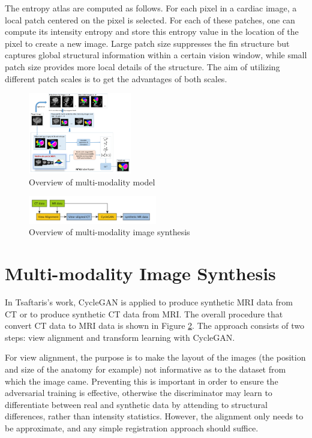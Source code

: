 \documentclass[10pt,sigconf,letterpaper,nonacm]{acmart}
\begin{document}
 The entropy atlas are computed as follows\cite{wachinger2012entropy}. For each pixel in a cardiac image, a local patch centered on the pixel is selected. For each of these patches, one can compute its intensity entropy and store this entropy value in the location of the pixel to create a new image. Large patch size suppresses the fin structure but captures global structural information within a certain vision window, while small patch size provides more local details of the structure. The aim of utilizing different patch scales is to get the advantages of both scales.
 
 
\begin{figure}
	\centering
	\includegraphics[width=0.4\textwidth]{images/yihao_overview.png}
	\caption{Overview of multi-modality model}
	\label{yihao_overview}
\end{figure} 

\begin{figure}
	\centering
	\includegraphics[width=0.5\textwidth]{images/Xiangyu_overview.png}
	\caption{Overview of multi-modality image synthesis}
	\label{Xiangyu_overview}
\end{figure} 

\section{Multi-modality Image Synthesis}
 In Tsaftaris's work\cite{Tsaftaris2017}, CycleGAN is applied to produce synthetic MRI data from CT or to produce synthetic CT data from MRI. The overall procedure that convert CT data to MRI data is shown in Figure \ref{Xiangyu_overview}. The approach consists of two steps: view alignment and transform learning with CycleGAN. 
 
 For view alignment, the purpose is to make the layout of the images (the position and size of the anatomy for example) not informative as to the dataset from which the image came. Preventing this is important in order to ensure the adversarial training is effective, otherwise the discriminator may learn to differentiate between real and synthetic data by attending to structural differences, rather than intensity statistics. However, the alignment only needs to be approximate, and any simple registration approach should suffice.
 
\end{document}
